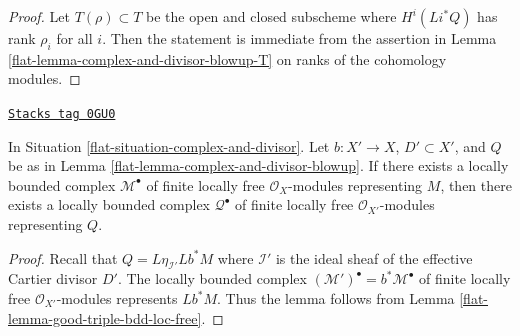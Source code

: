 \begin{proof}

Let $T(\rho) \subset T$ be the open and closed subscheme
where $H^i(Li^*Q)$ has rank $\rho_i$ for all $i$. Then the statement
is immediate from the assertion in
Lemma \ref{flat-lemma-complex-and-divisor-blowup-T}
on ranks of the cohomology modules.
\end{proof}

\begin{lemma}
\label{flat-lemma-complex-and-divisor-blowup-T-represented-bdd-loc-free}
\href{https://stacks.math.columbia.edu/tag/0GU0}{\texttt{Stacks tag 0GU0}}

In Situation \ref{flat-situation-complex-and-divisor}. Let $b : X' \to X$,
$D' \subset X'$, and $Q$ be as in
Lemma \ref{flat-lemma-complex-and-divisor-blowup}.
If there exists a locally bounded complex $\mathcal{M}^\bullet$
of finite locally free $\mathcal{O}_X$-modules representing $M$,
then there exists a locally bounded complex $\mathcal{Q}^\bullet$
of finite locally free $\mathcal{O}_{X'}$-modules representing $Q$.
\end{lemma}

\begin{proof}

Recall that $Q = L\eta_{\mathcal{I}'}Lb^*M$ where $\mathcal{I}'$ is the
ideal sheaf of the effective Cartier divisor $D'$.
The locally bounded complex
$(\mathcal{M}')^\bullet = b^*\mathcal{M}^\bullet$ of
finite locally free $\mathcal{O}_{X'}$-modules
represents $Lb^*M$. Thus the lemma follows from
Lemma \ref{flat-lemma-good-triple-bdd-loc-free}.
\end{proof}

